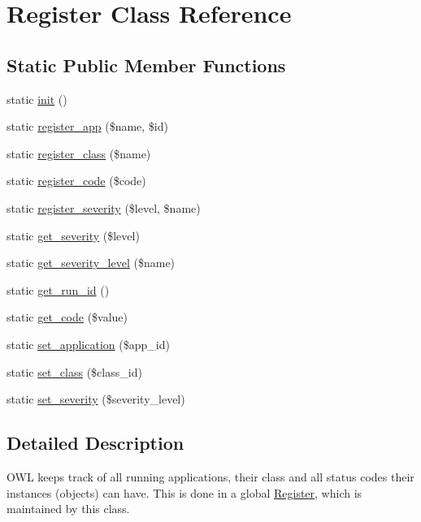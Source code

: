 \hypertarget{classRegister}{
\section{Register Class Reference}
\label{classRegister}
}
\subsection*{Static Public Member Functions}
\begin{CompactItemize}
\item 
static \hyperlink{classRegister_5c34c30e9e6ce4dea2dbb02f55e9278a}{init} ()
\item 
static \hyperlink{classRegister_c547568c4a7272fdaf65cb2825eccec3}{register\_\-app} (\$name, \$id)
\item 
static \hyperlink{classRegister_58300f74d002f1306a03baf12af0f02c}{register\_\-class} (\$name)
\item 
static \hyperlink{classRegister_875fd1f32f0746aa9e0e00b053c7389a}{register\_\-code} (\$code)
\item 
static \hyperlink{classRegister_c22a104eefa471675cb28ee20821eaad}{register\_\-severity} (\$level, \$name)
\item 
static \hyperlink{classRegister_e71e10bddb03483b54ad22b9edb95b7c}{get\_\-severity} (\$level)
\item 
static \hyperlink{classRegister_70490e59a4a3b910d259b8a4287c3e91}{get\_\-severity\_\-level} (\$name)
\item 
static \hyperlink{classRegister_041706fafb409a31f125d2075501e82e}{get\_\-run\_\-id} ()
\item 
static \hyperlink{classRegister_363389530273f40c3b20666bbff75e05}{get\_\-code} (\$value)
\item 
static \hyperlink{classRegister_d4d61787414f7d64d1e3420f0fdf3f91}{set\_\-application} (\$app\_\-id)
\item 
static \hyperlink{classRegister_58e49ccb1fe4e441d0329e879c922aa0}{set\_\-class} (\$class\_\-id)
\item 
static \hyperlink{classRegister_0adde8d67d77b9b4d66156272cb48ae4}{set\_\-severity} (\$severity\_\-level)
\end{CompactItemize}


\subsection{Detailed Description}
OWL keeps track of all running applications, their class and all status codes their instances (objects) can have. This is done in a global \hyperlink{classRegister}{Register}, which is maintained by this class. 

